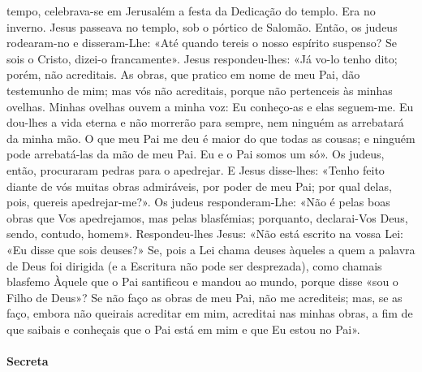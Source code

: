 \begin{paracol}{2}
{ tempo, celebrava-se em Jerusalém a festa da Dedicação do templo. Era no inverno. Jesus passeava no templo, sob o pórtico de Salomão. Então, os judeus rodearam-no e disseram-Lhe: «Até quando tereis o nosso espírito suspenso? Se sois o Cristo, dizei-o francamente». Jesus respondeu-lhes: «Já vo-lo tenho dito; porém, não acreditais. As obras, que pratico em nome de meu Pai, dão testemunho de mim; mas vós não acreditais, porque não pertenceis às minhas ovelhas. Minhas ovelhas ouvem a minha voz: Eu conheço-as e elas seguem-me. Eu dou-lhes a vida eterna e não morrerão para sempre, nem ninguém as arrebatará da minha mão. O que meu Pai me deu é maior do que todas as cousas; e ninguém pode arrebatá-las da mão de meu Pai. Eu e o Pai somos um só». Os judeus, então, procuraram pedras para o apedrejar. E Jesus disse-lhes: «Tenho feito diante de vós muitas obras admiráveis, por poder de meu Pai; por qual delas, pois, quereis apedrejar-me?». Os judeus responderam-Lhe: «Não é pelas boas obras que Vos apedrejamos, mas pelas blasfémias; porquanto, declarai-Vos Deus, sendo, contudo, homem». Respondeu-lhes Jesus: «Não está escrito na vossa Lei: «Eu disse que sois deuses?» Se, pois a Lei chama deuses àqueles a quem a palavra de Deus foi dirigida (e a Escritura não pode ser desprezada), como chamais blasfemo Àquele que o Pai santificou e mandou ao mundo, porque disse «sou o Filho de Deus»? Se não faço as obras de meu Pai, não me acrediteis; mas, se as faço, embora não queirais acreditar em mim, acreditai nas minhas obras, a fim de que saibais e conheçais que o Pai está em mim e que Eu estou no Pai».
}\end{paracol}

\begin{paracol}{2}\switchcolumn{}\end{paracol}

\paragraph{Secreta}
\begin{paracol}{2}\switchcolumn{}\end{paracol}

